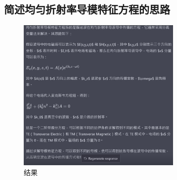\documentclass[12pt, a4paper, oneside]{article}
\begin{document}
\begin{spacing}{2.0}
\section{简述均匀折射率导模特征方程的思路}
\begin{figure}[htbp][H]
    \centering
    \includegraphics[width=8cm]{A.jpg}
    \caption{结果}
\end{figure}




\end{spacing}{}
\end{document}
